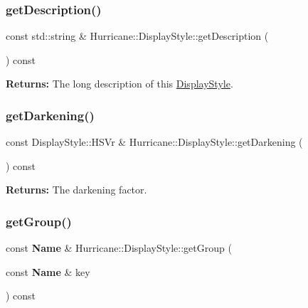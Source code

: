 \subsubsection{\texorpdfstring{get\+Description()}{getDescription()}}
{\footnotesize\ttfamily const std\+::string \& Hurricane\+::\+Display\+Style\+::get\+Description (\begin{DoxyParamCaption}{ }\end{DoxyParamCaption}) const\hspace{0.3cm}{\ttfamily [inline]}}

{\bfseries Returns\+:} The long description of this \mbox{\hyperlink{classHurricane_1_1DisplayStyle}{Display\+Style}}. \mbox{\label{classHurricane_1_1DisplayStyle_ab3e8eaedf1567526e5615addb525fc73}} 
\subsubsection{\texorpdfstring{get\+Darkening()}{getDarkening()}}
{\footnotesize\ttfamily const Display\+Style\+::\+H\+S\+Vr \& Hurricane\+::\+Display\+Style\+::get\+Darkening (\begin{DoxyParamCaption}{ }\end{DoxyParamCaption}) const\hspace{0.3cm}{\ttfamily [inline]}}

{\bfseries Returns\+:} The darkening factor. \mbox{\label{classHurricane_1_1DisplayStyle_af4efb49cf791189ba5f53fbbdd7c6675}} 
\subsubsection{\texorpdfstring{get\+Group()}{getGroup()}}
{\footnotesize\ttfamily const \textbf{ Name} \& Hurricane\+::\+Display\+Style\+::get\+Group (\begin{DoxyParamCaption}\item[{const \textbf{ Name} \&}]{key }\end{DoxyParamCaption}) const}

